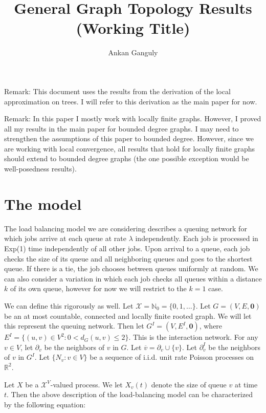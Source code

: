 \documentclass[12pt]{article}
\newcommand{\skipLine}{\vspace{12pt}}
\newcommand{\mb}{\mathbb}
\newcommand{\mc}{\mathcal}
\newcommand{\ov}{\overline}
\newcommand{\ind}{\hspace{24pt}}
\newcommand{\Xf}{X}									%
\newcommand{\vcomp}[1]{_{#1}}						%
\newcommand{\tme}[1]{(#1)}							%
\newcommand{\stte}{\mc{X}}							%
\newcommand{\arr}{\lambda}							%
\newcommand{\poiss}{N}								%
\newcommand{\poissv}[1]{_{#1}}						%
\newcommand{\neigh}[1]{\partial_{#1}}
\newcommand{\cl}[1]{\ov{#1}}
\renewcommand{\root}{\mathbf{0}}
\newcommand{\inter}[1]{#1^I}
\newcommand{\neighI}[1]{\partial^I_{#1}}
\begin{document}
\title{General Graph Topology Results (Working Title)}
\author{Ankan Ganguly}

\maketitle

Remark: This document uses the results from the derivation of the local approximation on trees. I will refer to this derivation as the main paper for now.

\skipLine

Remark: In this paper I mostly work with locally finite graphs. However, I proved all my results in the main paper for bounded degree graphs. I may need to strengthen the assumptions of this paper to bounded degree. However, since we are working with local convergence, all results that hold for locally finite graphs should extend to bounded degree graphs (the one possible exception would be well-posedness results).

\section{The model}
\label{mod}

The load balancing model we are considering describes a queuing network for which jobs arrive at each queue at rate \(\arr\) independently. Each job is processed in Exp(1) time independently of all other jobs. Upon arrival to a queue, each job checks the size of its queue and all neighboring queues and goes to the shortest queue. If there is a tie, the job chooses between queues uniformly at random. We can also consider a variation in which each job checks all queues within a distance \(k\) of its own queue, however for now we will restrict to the \(k=1\) case.

\ind We can define this rigorously as well. Let \(\stte = \mb{N}_0 = \{0,1,\dots\}\). Let \(G = (V,E,\root)\) be an at most countable, connected and locally finite rooted graph. We will let this represent the queuing network. Then let \(\inter{G} = (V,\inter{E},\root)\), where \(\inter{E} = \{(u,v) \in V^2: 0 < d_G(u,v)\leq 2\}\). This is the interaction network. For any \(v \in V\), let \(\neigh{v}\) be the neighbors of \(v\) in \(G\). Let \(\cl{v} = \neigh{v}\cup \{v\}\). Let \(\neighI{v}\) be the neighbors of \(v\) in \(\inter{G}\). Let \(\{\poiss\poissv{v}:v \in V\}\) be a sequence of i.i.d. unit rate Poisson processes on \(\mb{R}^2\).

\ind Let \(\Xf\) be a \(\stte^V\)-valued process. We let \(\Xf\vcomp{v}\tme{t}\) denote the size of queue \(v\) at time \(t\). Then the above description of the load-balancing model can be characterized by the following equation:
\end{document}
